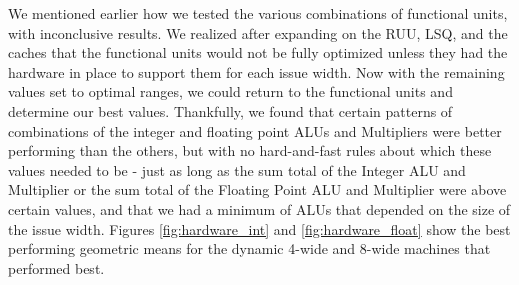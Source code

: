 \documentclass[paper=a4, fontsize=12pt]{scrartcl} %
\numberwithin{equation}{section} %
\numberwithin{figure}{section} %
\numberwithin{table}{section} %
\begin{document}
We mentioned earlier how we tested the various combinations of functional units, with inconclusive results. We realized after expanding on the RUU, LSQ, and the caches that the functional units would not be fully optimized unless they had the hardware in place to support them for each issue width. Now with the remaining values set to optimal ranges, we could return to the functional units and determine our best values. Thankfully, we found that certain patterns of combinations of the integer and floating point ALUs and Multipliers were better performing than the others, but with no hard-and-fast rules about which these values needed to be - just as long as the sum total of the Integer ALU and Multiplier or the sum total of the Floating Point ALU and Multiplier were above certain values, and that we had a minimum of ALUs that depended on the size of the issue width. Figures \ref{fig:hardware_int} and \ref{fig:hardware_float} show the best performing geometric means for the dynamic 4-wide and 8-wide machines that performed best.
\end{document}
